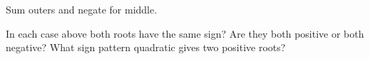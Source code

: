 \documentclass[12pt, a4paper, addpoints]{exam}
\begin{document}
\begin{questions}
\newpage


\question Sum outers and negate for middle.   
\setlength{\columnsep}{20pt}
\begin{multicols}{2}
\end{multicols}
\question In each case above both roots  have the same sign? Are they both positive or both negative? What sign pattern quadratic gives two positive roots?
\newpage


\end{questions}
\end{document}
